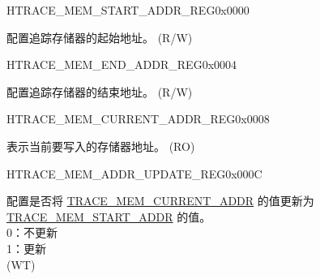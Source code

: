 \begin{register}{H}{TRACE\_MEM\_START\_ADDR\_REG}{0x0000}\label{regdesc:TRACEMEMSTARTADDRREG}
%
\regnewline%
\begin{regdesc}\begin{reglist}
\label{fielddesc:TRACEMEMSTARTADDR}\item [TRACE\_MEM\_START\_ADDR] 配置追踪存储器的起始地址。 (R/W)
\end{reglist}\end{regdesc}
\end{register}


\begin{register}{H}{TRACE\_MEM\_END\_ADDR\_REG}{0x0004}\label{regdesc:TRACEMEMENDADDRREG}
%
\regnewline%
\begin{regdesc}\begin{reglist}
\label{fielddesc:TRACEMEMENDADDR}\item [TRACE\_MEM\_END\_ADDR] 配置追踪存储器的结束地址。 (R/W)
\end{reglist}\end{regdesc}
\end{register}


\begin{register}{H}{TRACE\_MEM\_CURRENT\_ADDR\_REG}{0x0008}\label{regdesc:TRACEMEMCURRENTADDRREG}
%
\regnewline%
\begin{regdesc}\begin{reglist}
\label{fielddesc:TRACEMEMCURRENTADDR}\item [TRACE\_MEM\_CURRENT\_ADDR] 表示当前要写入的存储器地址。 (RO)
\end{reglist}\end{regdesc}
\end{register}


\begin{register}{H}{TRACE\_MEM\_ADDR\_UPDATE\_REG}{0x000C}\label{regdesc:TRACEMEMADDRUPDATEREG}
%
%
\regnewline%
\begin{regdesc}\begin{reglist}
\label{fielddesc:TRACEMEMCURRENTADDRUPDATE}\item [TRACE\_MEM\_CURRENT\_ADDR\_UPDATE] 配置是否将 \hyperref[fielddesc:TRACEMEMCURRENTADDR]{TRACE\_MEM\_CURRENT\_ADDR} 的值更新为 \hyperref[fielddesc:TRACEMEMSTARTADDR]{TRACE\_MEM\_START\_ADDR} 的值。\\
0：不更新\\
1：更新\\(WT)
\end{reglist}\end{regdesc}
\end{register}


